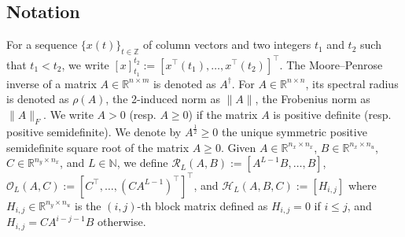 \documentclass[preprint,5p,times,twocolumn]{elsarticle}
\def\rank{{\rm rank} \hspace{0.5mm}}
\begin{document}
\subsection*{Notation}
For a sequence $\{x(t)\}_{t\in\mathbb{Z}}$ of column vectors and two integers $t_1$ and $t_2$ such that $t_1<t_2$,  we write $[x]_{t_1}^{t_2} := [x^{\top}(t_1), \ldots, x^{\top}(t_2)]^{\top}$. 
The Moore–Penrose inverse of a matrix $A \in \mathbb{R}^{n \times m}$ is denoted as $ A^{\dagger}$. 
For $A \in \mathbb R^{n \times n}$, its spectral radius is denoted as $\rho(A)$, the 2-induced norm as $\|A\|$, the Frobenius norm as $\|A\|_F$. 
We write $A > 0$ (resp. $A \geq 0$) if the matrix $A$ is positive definite (resp. positive semidefinite).
We denote by $A^{\frac{1}{2}}\geq 0$ the unique symmetric positive semidefinite square root of the matrix $A \geq 0$.
Given $A \in \mathbb R^{n_x \times n_x}$, $B \in \mathbb R^{n_x \times n_u}$, $C \in \mathbb R^{n_y \times n_x}$, and $L \in \mathbb{N}$, we define
$\mathcal R_L(A,B) := [A^{L-1}B, \ldots, B]$,  
$\mathcal O_L(A,C) := [C^{\top}, \ldots, (CA^{L-1})^{\top}]^{\top}$, and 
$\mathcal H_L(A,B,C) := [H_{i,j}]$ where $H_{i,j} \in \mathbb{R}^{n_y \times n_u}$ is the $(i,j)$-th block matrix defined as $H_{i,j} = 0$ if $i \leq j$, and $H_{i,j} = CA^{i-j-1}B$ otherwise. 
\end{document}
